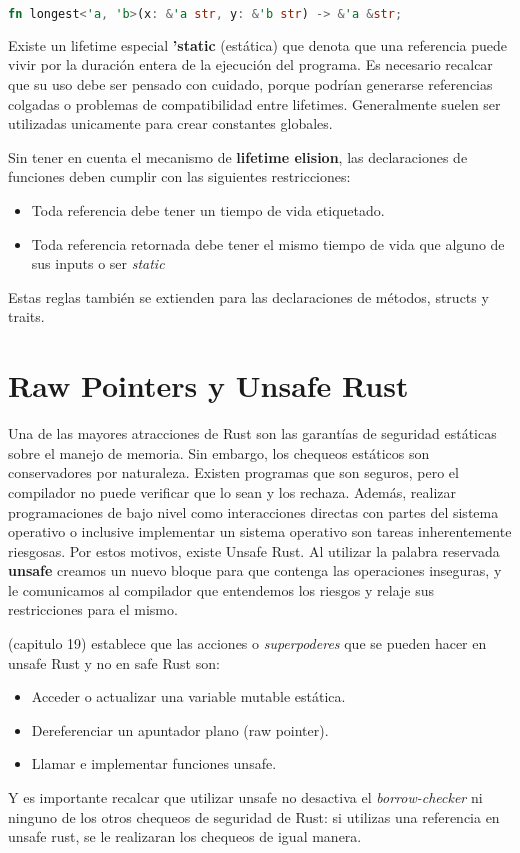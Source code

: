 \begin{lstlisting}[language=Rust]
    fn longest<'a, 'b>(x: &'a str, y: &'b str) -> &'a &str;
\end{lstlisting}

Existe un lifetime especial \textbf{'static} (estática) que denota que una referencia puede vivir por la duración entera de la ejecución del programa. Es necesario recalcar que su uso debe ser pensado con cuidado, porque podrían generarse referencias colgadas o problemas de compatibilidad entre lifetimes. Generalmente suelen ser utilizadas unicamente para crear constantes globales.

Sin tener en cuenta el mecanismo de \textbf{lifetime elision}, las declaraciones de funciones deben cumplir con las siguientes restricciones:
\begin{itemize}
    \item Toda referencia debe tener un tiempo de vida etiquetado.
    \item Toda referencia retornada debe tener el mismo tiempo de vida que alguno de sus inputs o ser \textit{static}
\end{itemize}
Estas reglas también se extienden para las declaraciones de métodos, structs y traits.

\section{Raw Pointers y Unsafe Rust}

Una de las mayores atracciones de Rust son las garantías de seguridad estáticas sobre el manejo de memoria. Sin embargo, los chequeos estáticos son conservadores por naturaleza. Existen programas que son seguros, pero el compilador no puede verificar que lo sean y los rechaza. Además, realizar programaciones de bajo nivel como interacciones directas con partes del sistema operativo o inclusive implementar un sistema operativo son tareas inherentemente riesgosas. Por estos motivos, existe Unsafe Rust. Al utilizar la palabra reservada \textbf{unsafe} creamos un nuevo bloque para que contenga las operaciones inseguras, y le comunicamos al compilador que entendemos los riesgos y relaje sus restricciones para el mismo.

\cite{rustbook} (capitulo 19) establece que las acciones o \textit{superpoderes} que se pueden hacer en unsafe Rust y no en safe Rust son:
\begin{itemize}
    \item Acceder o actualizar una variable mutable estática.
    \item Dereferenciar un apuntador plano (raw pointer).
    \item Llamar e implementar funciones unsafe.
\end{itemize}
Y es importante recalcar que utilizar unsafe no desactiva el \textit{borrow-checker} ni ninguno de los otros chequeos de seguridad de Rust: si utilizas una referencia en unsafe rust, se le realizaran los chequeos de igual manera.

